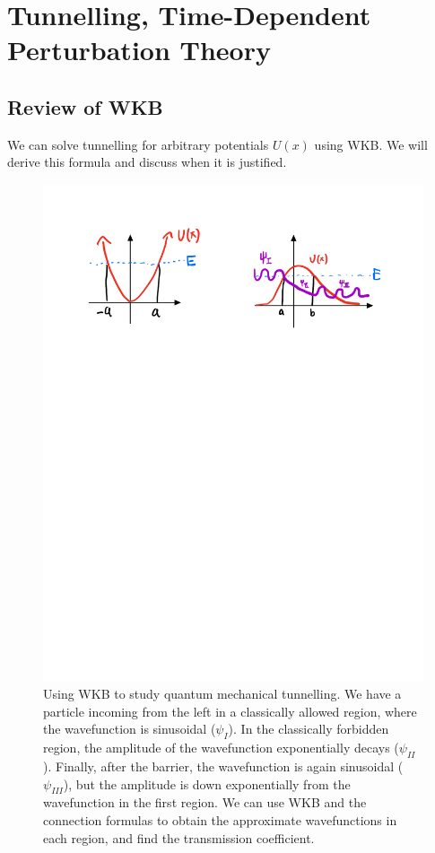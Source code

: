 \section{Tunnelling, Time-Dependent Perturbation Theory}

\subsection{Review of WKB}
We can solve tunnelling for arbitrary potentials $U(x)$ using WKB. We will derive this formula and discuss when it is justified. 

\begin{figure}[htbp]
    \centering
    \includegraphics[]{Images/fig-WKBtunnelling.pdf}
    
    \caption{Using WKB to study quantum mechanical tunnelling. We have a particle incoming from the left in a classically allowed region, where the wavefunction is sinusoidal ($\psi_{I}$). In the classically forbidden region, the amplitude of the wavefunction exponentially decays ($\psi_{II}$). Finally, after the barrier, the wavefunction is again sinusoidal ($\psi_{III}$), but the amplitude is down exponentially from the wavefunction in the first region. We can use WKB and the connection formulas to obtain the approximate wavefunctions in each region, and find the transmission coefficient.}
    \label{fig-WKBtunnelling}
\end{figure}

